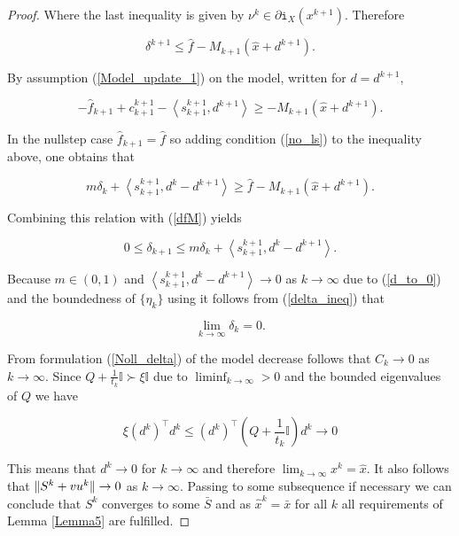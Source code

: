 \begin{proof}
Where the last inequality is given by \(\nu^k \in \partial\mathtt{i}_{X}(x^{k+1})\). Therefore 

\begin{equation}
	\delta^{k+1} \leq \hat{f}-M_{k+1}(\hat{x}+d^{k+1}).
	\label{dfM}
\end{equation}

By assumption (\ref{Model_update_1}) on the model, written for \(d=d^{k+1}\),

\begin{equation*}
	-\hat{f}_{k+1}+c^{k+1}_{k+1}-\left\langle s^{k+1}_{k+1},d^{k+1}\right\rangle \geq -M_{k+1}(\hat{x}+d^{k+1}).
\end{equation*}

In the nullstep case \(\hat{f}_{k+1}=\hat{f}\) so adding condition (\ref{no_ls}) to the inequality above, one obtains that

\begin{equation*}
	m\delta_k+\left\langle s^{k+1}_{k+1},d^k-d^{k+1}\right\rangle \geq \hat{f}-M_{k+1}(\hat{x}+d^{k+1}).
\end{equation*}

Combining this relation with (\ref{dfM}) yields

\begin{equation*}
	0 \leq \delta_{k+1} \leq m\delta_k + \left\langle s^{k+1}_{k+1},d^k-d^{k+1}\right\rangle.
	\label{delta_ineq}
\end{equation*}

Because \(m \in (0,1)\) and \(\left\langle s^{k+1}_{k+1},d^k-d^{k+1}\right\rangle \to 0\) as \(k \to \infty\) due to (\ref{d_to_0}) and the boundedness of \(\{\eta_k\}\) using \cite[Lemma 3, p.45]{Polyak1987} it follows from  (\ref{delta_ineq}) that 

\begin{equation*}
	\lim_{k \to \infty} \delta_k = 0.
\end{equation*}

From  formulation (\ref{Noll_delta}) of the model decrease follows that \(C_k \to 0\) as \(k \to \infty\). Since {\(Q+\frac{1}{t_k}\mathbb{I} \succ \xi\mathbb{I}\)} due to \(\liminf_{k \to \infty} > 0\) and the bounded eigenvalues of \(Q\) we have 

\begin{equation*}
	\xi \left(d^k\right)^{\top}d^k \leq \left(d^k\right)^{\top}\left(Q+\frac{1}{t_k}\mathbb{I}\right)d^k \to 0
\end{equation*}

This means that \(d^k \to 0\) for \(k \to \infty\) and therefore \(\lim_{k \to \infty}x^k = \hat{x}\). It also follows that \(\|S^k+\\vu^k\| \to 0\) as \(k \to \infty\). Passing to some subsequence if necessary we can conclude that \(S^k\) converges to some \(\bar{S}\) and as \(\hat{x}^k = \bar{x}\) for all \(k\) all requirements of Lemma \ref{Lemma5} are fulfilled.

\end{proof}

